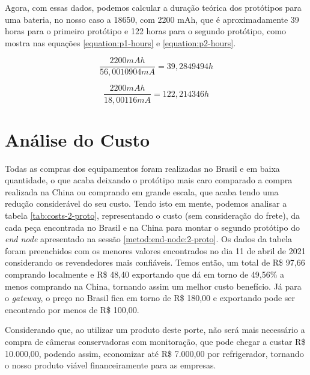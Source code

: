 Agora, com essas dados, podemos calcular a duração teórica dos protótipos  para uma bateria, no nosso caso a 18650, com 2200 mAh, que é aproximadamente 39 horas para o primeiro protótipo e 122 horas para o segundo protótipo, como mostra nas equações \ref{equation:p1-hours} e \ref{equation:p2-hours}.

\begin{equation}
  \frac{2200 mAh}{56,0010904 mA} = 39,2849494 h
  \label{equation:p1-hours} 
\end{equation}

\begin{equation}
  \frac{2200 mAh}{18,00116 mA} = 122,214346 h
  \label{equation:p2-hours} 
\end{equation}

\section{Análise do Custo}
\label{result:custo}
Todas as compras dos equipamentos foram realizadas no Brasil e em baixa quantidade, o que acaba deixando o protótipo mais caro comparado a compra realizada na China ou comprando em grande escala, que acaba tendo uma redução considerável do seu custo. Tendo isto em mente, podemos analisar a tabela \ref{tab:costs-2-proto}, representando o custo (sem consideração do frete), da cada peça encontrada no Brasil e na China para montar o segundo protótipo do \textit{end node} apresentado na sessão \ref{metod:end-node:2-proto}. Os dados da tabela foram preenchidos com os menores valores encontrados no dia 11 de abril de 2021 considerando os revendedores mais confiáveis. Temos então, um total de R\$ 97,66 comprando localmente e R\$ 48,40 exportando que dá em torno de 49,56\% a menos comprando na China, tornando assim um melhor custo benefício.	Já para o \textit{gateway}, o preço no Brasil fica em torno de R\$  180,00 e exportando pode ser encontrado por menos de R\$  100,00.

Considerando que, ao utilizar um produto deste porte, não será mais necessário a compra de câmeras conservadoras com monitoração,  que pode chegar a custar R\$ 10.000,00, podendo assim, economizar até R\$ 7.000,00 por refrigerador, tornando o nosso produto viável financeiramente para as empresas.

